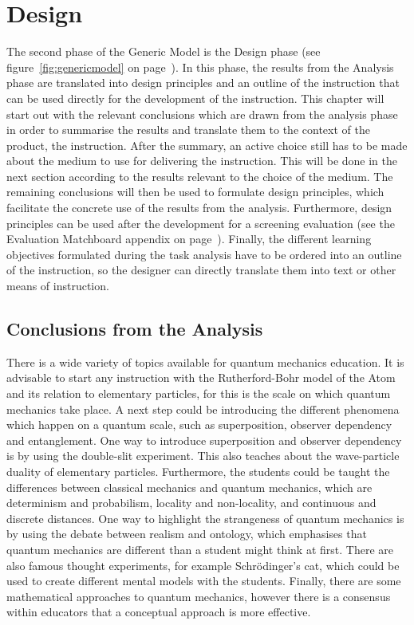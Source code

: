 \documentclass[11pt,twoside]{report} %
\begin{document}

\part{Design}
\thispagestyle{fancy}

The second phase of the Generic Model is the Design phase \cite{genericmodel} (see figure~\ref{fig:genericmodel} on page~\pageref{fig:genericmodel}). In this phase, the results from the Analysis phase are translated into design principles and an outline of the instruction that can be used directly for the development of the instruction. This chapter will start out with the relevant conclusions which are drawn from the analysis phase in order to summarise the results and translate them to the context of the product, the instruction. After the summary, an active choice still has to be made about the medium to use for delivering the instruction. This will be done in the next section according to the results relevant to the choice of the medium. The remaining conclusions will then be used to formulate design principles, which facilitate the concrete use of the results from the analysis. Furthermore, design principles can be used after the development for a screening evaluation \cite{evamatchboard} (see the Evaluation Matchboard appendix on page~\pageref{app:evamatchboard}). Finally, the different learning objectives formulated during the task analysis have to be ordered into an outline of the instruction, so the designer can directly translate them into text or other means of instruction.

\chapter{Conclusions from the Analysis}

There is a wide variety of topics available for quantum mechanics education. It is advisable to start any instruction with the Rutherford-Bohr model of the Atom and its relation to elementary particles, for this is the scale on which quantum mechanics take place. A next step could be introducing the different phenomena which happen on a quantum scale, such as superposition, observer dependency and entanglement. One way to introduce superposition and observer dependency is by using the double-slit experiment. This also teaches about the wave-particle duality of elementary particles. Furthermore, the students could be taught the differences between classical mechanics and quantum mechanics, which are determinism and probabilism, locality and non-locality, and continuous and discrete distances. One way to highlight the strangeness of quantum mechanics is by using the debate between realism and ontology, which emphasises that quantum mechanics are different than a student might think at first. There are also famous thought experiments, for example Schrödinger's cat, which could be used to create different mental models with the students. Finally, there are some mathematical approaches to quantum mechanics, however there is a consensus within educators that a conceptual approach is more effective.
\end{document}
